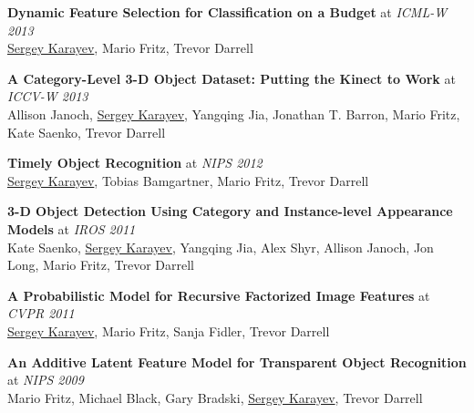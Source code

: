 \documentclass[line, margin]{res}
\begin{document}
\begin{resume}
\textbf{Dynamic Feature Selection for Classification on a Budget} at \emph{ICML-W 2013}\\
\underline{Sergey Karayev}, Mario Fritz, Trevor Darrell

\textbf{A Category-Level 3-D Object Dataset: Putting the Kinect to Work} at \emph{ICCV-W 2013}\\
Allison Janoch, \underline{Sergey Karayev}, Yangqing Jia, Jonathan T. Barron, Mario Fritz, Kate Saenko, Trevor Darrell

\textbf{Timely Object Recognition} at \emph{NIPS 2012}\\
\underline{Sergey Karayev}, Tobias Bamgartner, Mario Fritz, Trevor Darrell

\textbf{3-D Object Detection Using Category and Instance-level Appearance Models} at \emph{IROS 2011}\\
Kate Saenko, \underline{Sergey Karayev}, Yangqing Jia, Alex Shyr, Allison Janoch, Jon Long, Mario Fritz, Trevor Darrell

\textbf{A Probabilistic Model for Recursive Factorized Image Features} at \emph{CVPR 2011}\\
\underline{Sergey Karayev}, Mario Fritz, Sanja Fidler, Trevor Darrell

\textbf{An Additive Latent Feature Model for Transparent Object Recognition} at \emph{NIPS 2009}\\
Mario Fritz, Michael Black, Gary Bradski, \underline{Sergey Karayev}, Trevor Darrell



\end{resume}
\end{document}
